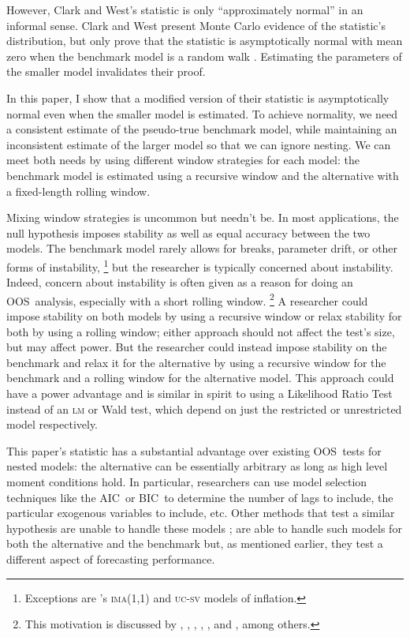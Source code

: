 \documentclass[12pt,fleqn]{article}
\newcommand\citepos[2][]{\citeauthor{#2}'s \citeyearpar[#1]{#2}}
\theoremstyle{definition}
\newcommand{\aic}{AIC}
\newcommand{\bic}{BIC}
\newcommand{\oos}{OOS}
\begin{document}
However, Clark and West's statistic is only ``approximately normal''
in an informal sense.  Clark and West present Monte Carlo evidence of
the statistic's distribution, but only prove that the statistic is
asymptotically normal with mean zero when the benchmark model is a
random walk \citep{ClW:06}. Estimating the parameters of the smaller
model invalidates their proof.

In this paper, I show that a modified version of their statistic is
asymptotically normal even when the smaller model is estimated.  To
achieve normality, we need a consistent estimate of the pseudo-true
benchmark model, while maintaining an inconsistent estimate of the
larger model so that we can ignore nesting.  We can meet both needs by
using different window strategies for each model: the benchmark model
is estimated using a recursive window and the alternative with a
fixed-length rolling window.

Mixing window strategies is uncommon but needn't be. In most
applications, the null hypothesis imposes stability as well as equal
accuracy between the two models.  The benchmark model rarely allows
for breaks, parameter drift, or other forms of
instability,%
\footnote{Exceptions are \citepos{StW:07}
  \textsc{ima}(1,1) and \textsc{uc-sv} models of inflation.} %
but the
researcher is typically concerned about instability.  Indeed, concern
about instability is often given as a reason for doing an \oos\
analysis, especially with a short rolling window.%
\footnote{This
  motivation is discussed by \citet{StW:03}, \citet{PeT:05,PeT:07},
  \cite{GiW:06}, \citet{GoW:08}, \citet{ClM:09c}, and
  \cite{GiR:09,GiR:10}, among others.} %
A researcher could impose
stability on both models by using a recursive window or relax
stability for both by using a rolling window; either approach should
not affect the test's size, but may affect power.  But the researcher
could instead impose stability on the benchmark and relax it for the
alternative by using a recursive window for the benchmark and a
rolling window for the alternative model.  This approach could have a
power advantage and is similar in spirit to using a Likelihood Ratio
Test instead of an \textsc{lm} or Wald test, which depend on just the
restricted or unrestricted model respectively.

This paper's statistic has a substantial advantage over existing \oos\
tests for nested models: the alternative can be essentially arbitrary
as long as high level moment conditions hold.  In particular,
researchers can use model selection techniques like the \aic\ or \bic\
to determine the number of lags to include, the particular exogenous
variables to include, etc.  Other methods that test a similar
hypothesis are unable to handle these models \citep[except][which does
not allow the benchmark to be estimated]{ClW:06}; \citet{GiW:06} are
able to handle such models for both the alternative and the benchmark
but, as mentioned earlier, they test a different aspect of forecasting
performance.
\end{document}
